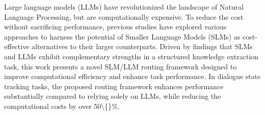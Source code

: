 Large language models (LLMs) have revolutionized the landscape of Natural Language Processing, but are computationally expensive. To reduce the cost without sacrificing performance, previous studies have explored various approaches to harness the potential of Smaller Language Models (SLMs) as cost-effective alternatives to their larger counterparts. Driven by findings that SLMs and LLMs exhibit complementary strengths in a structured knowledge extraction task, this work presents a novel SLM/LLM routing framework designed to improve computational efficiency and enhance task performance. In dialogue state tracking tasks, the proposed routing framework enhances performance substantially compared to relying solely on LLMs, while reducing the computational costs by over 50\textbackslash\{\}\%.